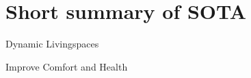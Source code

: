 \documentclass[10pt]{beamer}
\begin{document}

\section{Short summary of SOTA}


{
	\begin{frame}{Dynamic Livingspaces}
	
\end{frame}
}


{
\begin{frame}{Improve Comfort and Health}

\end{frame}
}
\end{document}

